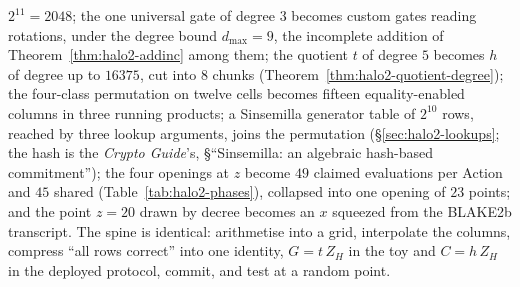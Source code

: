 \documentclass[11pt,a4paper]{article}
\theoremstyle{definition}
\newcommand{\ZH}{Z_H}
\begin{document}
$2^{11} = 2048$; the one universal gate of degree $3$ becomes custom
gates reading rotations, under the degree bound $d_{\max} = 9$, the
incomplete addition of Theorem~\ref{thm:halo2-addinc} among them; the
quotient $t$ of degree $5$ becomes $h$ of degree up to $16375$, cut
into $8$ chunks (Theorem~\ref{thm:halo2-quotient-degree}); the
four-class permutation on twelve cells becomes fifteen equality-enabled
columns in three running products; a Sinsemilla generator table of
$2^{10}$ rows, reached by three lookup arguments, joins the
permutation (\S\ref{sec:halo2-lookups}; the hash is the \emph{Crypto
Guide}'s, \S``Sinsemilla: an algebraic hash-based commitment''); the
four openings at $z$ become $49$ claimed evaluations per Action and
$45$ shared (Table~\ref{tab:halo2-phases}), collapsed into one opening
of $23$ points; and the point
$z = 20$ drawn by decree becomes an $x$ squeezed from the BLAKE2b
transcript. The spine is identical: arithmetise into a grid,
interpolate the columns, compress ``all rows correct'' into one
identity, $G = t\,\ZH$ in the toy and $C = h\,\ZH$ in the deployed
protocol, commit, and test at a random point.
\end{document}

